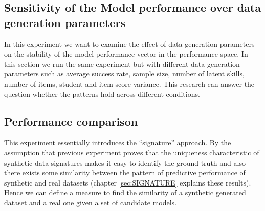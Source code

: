 \subsection{Sensitivity of the Model performance over data generation parameters}
\label{Sensitive}

In this experiment we want to examine the effect of data generation parameters on the stability of the model performance vector in the performance space. In this section we run the same experiment but with different data generation parameters such as average success rate, sample size, number of latent skills, number of items, student and item score variance. This research can answer the question whether the patterns hold across different conditions.

\subsection{Performance comparison}
This experiment essentially introduces the ``signature'' approach. By the assumption that previous experiment proves that the uniqueness characteristic of synthetic data signatures makes it easy to identify the ground truth and also there exists some similarity between the pattern of predictive performance of synthetic and real datasets (chapter \ref{sec:SIGNATURE} explains these results). Hence we can define a measure to find the similarity of a synthetic generated dataset and a real one given a set of candidate models.

